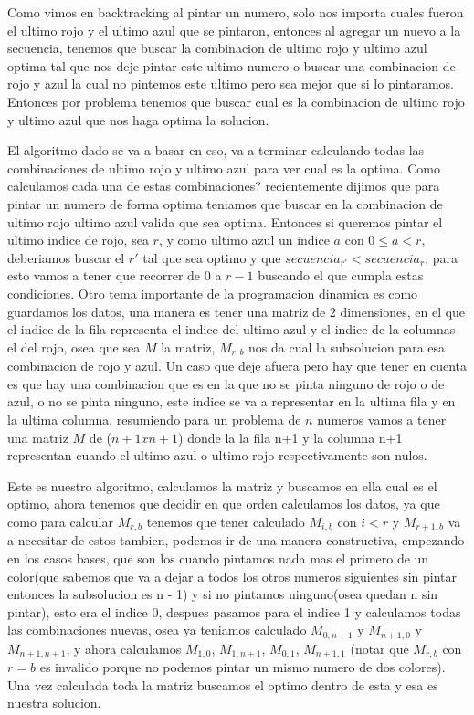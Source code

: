 Como vimos en backtracking al pintar un numero, solo nos importa cuales fueron el ultimo rojo y el ultimo azul que se pintaron, entonces al agregar un nuevo a la secuencia, tenemos que buscar la combinacion de ultimo rojo y ultimo azul optima tal que nos deje pintar este ultimo numero o buscar una combinacion de rojo y azul la cual no pintemos este ultimo pero sea mejor que si lo pintaramos. Entonces por problema tenemos que buscar cual es la combinacion de ultimo rojo y ultimo azul que nos haga optima la solucion.

El algoritmo dado se va a basar en eso, va a terminar calculando todas las combinaciones de ultimo rojo y ultimo azul para ver cual es la optima. Como calculamos cada una de estas combinaciones? recientemente dijimos que para pintar un numero de forma optima teniamos que buscar en la combinacion de ultimo rojo ultimo azul valida que sea optima. Entonces si queremos pintar el ultimo indice de rojo, sea $r$, y como ultimo azul un indice $a$ con $0 \leq a < r$, deberiamos buscar el $r'$ tal que sea optimo y que $secuencia_{r'} < secuencia_r$, para esto vamos a tener que recorrer de $0$ a $r-1$ buscando el que cumpla estas condiciones.
Otro tema importante de la programacion dinamica es como guardamos los datos, una manera es tener una matriz de 2 dimensiones, en el que el indice de la fila representa el indice del ultimo azul y el indice de la columnas el del rojo, osea que sea $M$ la matriz, $M_{r,b}$ nos da cual la subsolucion para esa combinacion de rojo y azul. Un caso que deje afuera pero hay que tener en cuenta es que hay una combinacion que es en la que no se pinta ninguno de rojo o de azul, o no se pinta ninguno, este indice se va a representar en la ultima fila y en la ultima columna, resumiendo para un problema de $n$ numeros vamos a tener una matriz $M$ de ($n+1 x n+1$) donde la la fila n+1 y la columna n+1 representan cuando el ultimo azul o ultimo rojo respectivamente son nulos.

Este es nuestro algoritmo, calculamos la matriz y buscamos en ella cual es el optimo, ahora tenemos que decidir en que orden calculamos los datos, ya que como para calcular $M_{r,b}$ tenemos que tener calculado $M_{i,b}$ con $i<r$ y $M_{r+1,b}$ va a necesitar de estos tambien, podemos ir de una manera constructiva, empezando en los casos bases, que son los cuando pintamos nada mas el primero de un color(que sabemos que va a dejar a todos los otros numeros siguientes sin pintar entonces la subsolucion es n - 1) y si no pintamos ninguno(osea quedan n sin pintar), esto era el indice 0, despues pasamos para el indice 1 y calculamos todas las combinaciones nuevas, osea ya teniamos calculado $M_{0,n+1}$ y $M_{n+1,0}$ y $M_{n+1,n+1}$, y ahora calculamos $M_{1,0}$, $M_{1,n+1}$, $M_{0,1}$, $M_{n+1, 1}$ (notar que $M_{r,b}$ con $r = b$ es invalido porque no podemos pintar un mismo numero de dos colores). Una vez calculada toda la matriz buscamos el optimo dentro de esta y esa es nuestra solucion.


